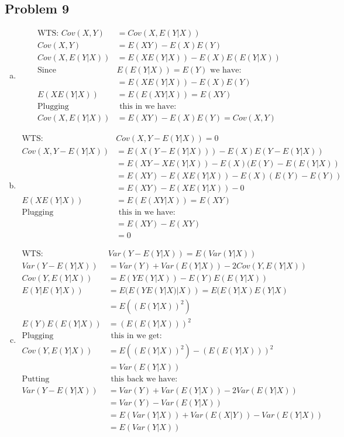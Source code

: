 \documentclass{article}
\begin{document}
\begin{flushleft}
\section*{Problem 9}
\begin{enumerate}[(a)]
\item
\begin{align*}
\text{WTS: } Cov(X,Y)&=Cov(X,E(Y|X))\\
Cov(X,Y)&=E(XY)-E(X)E(Y)\\
Cov(X,E(Y|X))&=E(XE(Y|X))-E(X)E(E(Y|X))\\
\text{Since }& E(E(Y|X))=E(Y) \text{ we have:}\\
&=E(XE(Y|X))-E(X)E(Y)\\
E(XE(Y|X))&=E(E(XY|X))=E(XY)\\
\text{Plugging}&\text{ this in we have:}\\
Cov(X,E(Y|X))&=E(XY)-E(X)E(Y)=Cov(X,Y)
\end{align*}
\item
\begin{align*}
\text{WTS: }& Cov(X,Y-E(Y|X))=0\\
Cov(X,Y-E(Y|X))&=E(X(Y-E(Y|X)))-E(X)E(Y-E(Y|X))\\
&=E(XY-XE(Y|X))-E(X)(E(Y)-E(E(Y|X))\\
&=E(XY)-E(XE(Y|X))-E(X)(E(Y)-E(Y))\\
&=E(XY)-E(XE(Y|X))-0\\
E(XE(Y|X))&=E(E(XY|X))=E(XY)\\
\text{Plugging}&\text{ this in we have:}\\
&=E(XY)-E(XY)\\
&=0
\end{align*}
\item
\begin{align*}
\text{WTS: }& Var(Y-E(Y|X))=E(Var(Y|X))\\
Var(Y-E(Y|X))&=Var(Y)+Var(E(Y|X))-2Cov(Y,E(Y|X))\\
Cov(Y,E(Y|X))&=E(YE(Y|X))-E(Y)E(E(Y|X))\\
E(Y|E(Y|X))&=E(E(YE(Y|X)|X))=E(E(Y|X)E(Y|X)\\
&=E((E(Y|X))^2)\\
E(Y)E(E(Y|X))&=(E(E(Y|X)))^2\\
\text{Plugging}&\text{ this in we get:}\\
Cov(Y,E(Y|X))&=E((E(Y|X))^2)-(E(E(Y|X)))^2\\
&=Var(E(Y|X))\\
\text{Putting}&\text{ this back we have:}\\
Var(Y-E(Y|X))&=Var(Y)+Var(E(Y|X))-2Var(E(Y|X))\\
&=Var(Y)-Var(E(Y|X))\\
&=E(Var(Y|X))+Var(E(X|Y))-Var(E(Y|X))\\
&=E(Var(Y|X))
\end{align*}
\end{enumerate}
\end{flushleft}
\end{document}
